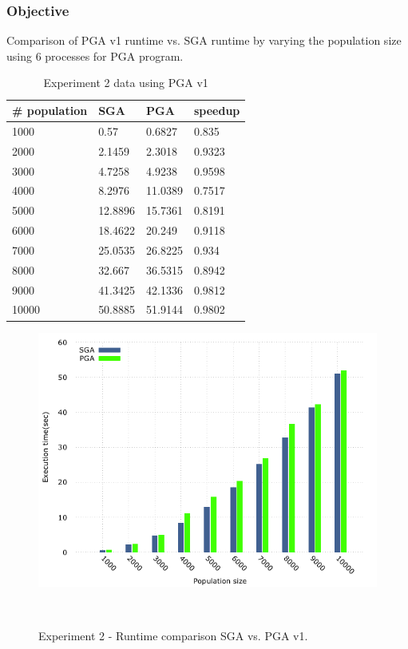 \subsubsection{Objective}
Comparison of PGA v1 runtime vs. SGA runtime by varying the population size using 6 processes for PGA program.

\begin{table}[H]
\centering
\caption{Experiment 2 data using PGA v1}
\label{tab:pga1_pop}
\begin{tabular}{|l|l|l|l|}
\hline
\# population & SGA     & PGA     & speedup \\ \hline
1000          & 0.57    & 0.6827  & 0.835   \\ \hline
2000          & 2.1459  & 2.3018  & 0.9323  \\ \hline
3000          & 4.7258  & 4.9238  & 0.9598  \\ \hline
4000          & 8.2976  & 11.0389 & 0.7517  \\ \hline
5000          & 12.8896 & 15.7361 & 0.8191  \\ \hline
6000          & 18.4622 & 20.249  & 0.9118  \\ \hline
7000          & 25.0535 & 26.8225 & 0.934   \\ \hline
8000          & 32.667  & 36.5315 & 0.8942  \\ \hline
9000          & 41.3425 & 42.1336 & 0.9812  \\ \hline
10000         & 50.8885 & 51.9144 & 0.9802  \\ \hline
\end{tabular}
\end{table}

\begin{figure}[H]
\begin{center}
  \includegraphics[width=.7 \linewidth]{stats_data_new/graphs/pga_xPop_hist.png}
  \caption{Experiment 2 - Runtime comparison SGA vs. PGA v1.}
  \end{center}\
\end{figure}

